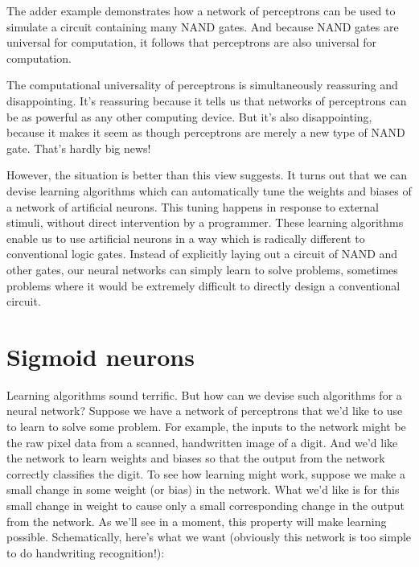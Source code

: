 \documentclass[a4paper,twoside,10pt]{book}
\begin{document}
The adder example demonstrates how a network of perceptrons can be used to simulate a circuit containing many NAND gates. And because NAND gates are universal for computation, it follows that perceptrons are also universal for computation.

The computational universality of perceptrons is simultaneously reassuring and disappointing. It's reassuring because it tells us that networks of perceptrons can be as powerful as any other computing device. But it's also disappointing, because it makes it seem as though perceptrons are merely a new type of NAND gate. That's hardly big news!

However, the situation is better than this view suggests. It turns out that we can devise learning algorithms which can automatically tune the weights and biases of a network of artificial neurons. This tuning happens in response to external stimuli, without direct intervention by a programmer. These learning algorithms enable us to use artificial neurons in a way which is radically different to conventional logic gates. Instead of explicitly laying out a circuit of NAND and other gates, our neural networks can simply learn to solve problems, sometimes problems where it would be extremely difficult to directly design a conventional circuit.

\section{Sigmoid neurons}
Learning algorithms sound terrific. But how can we devise such algorithms for a neural network? Suppose we have a network of perceptrons that we'd like to use to learn to solve some problem. For example, the inputs to the network might be the raw pixel data from a scanned, handwritten image of a digit. And we'd like the network to learn weights and biases so that the output from the network correctly classifies the digit. To see how learning might work, suppose we make a small change in some weight (or bias) in the network. What we'd like is for this small change in weight to cause only a small corresponding change in the output from the network. As we'll see in a moment, this property will make learning possible. Schematically, here's what we want (obviously this network is too simple to do handwriting recognition!):
\end{document}
